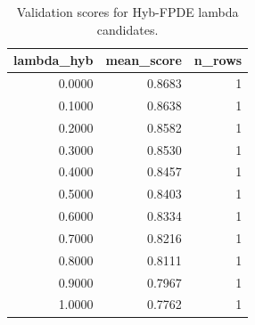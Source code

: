\begin{table}[t]
\caption{Validation scores for Hyb-FPDE lambda candidates.}
\label{tab:lambda_distribution_computed}
\centering
\begin{tabular}{rrr}
\toprule
lambda\_hyb & mean\_score & n\_rows \\
\midrule
0.0000 & 0.8683 & 1 \\
0.1000 & 0.8638 & 1 \\
0.2000 & 0.8582 & 1 \\
0.3000 & 0.8530 & 1 \\
0.4000 & 0.8457 & 1 \\
0.5000 & 0.8403 & 1 \\
0.6000 & 0.8334 & 1 \\
0.7000 & 0.8216 & 1 \\
0.8000 & 0.8111 & 1 \\
0.9000 & 0.7967 & 1 \\
1.0000 & 0.7762 & 1 \\
\bottomrule
\end{tabular}

\end{table}
